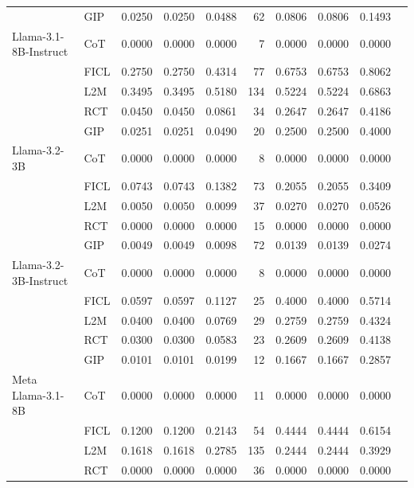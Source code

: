 \documentclass[conference]{IEEEtran}
\begin{document}
\begin{longtable}{p{3.5cm} l r r r r r r r r}
           & GIP  & 0.0250 & 0.0250 & 0.0488 & 62 & 0.0806 & 0.0806 & 0.1493 \\ \addlinespace
Llama-3.1-8B-Instruct & CoT  & 0.0000 & 0.0000 & 0.0000 & 7 & 0.0000 & 0.0000 & 0.0000 \\
                      & FICL & 0.2750 & 0.2750 & 0.4314 & 77 & 0.6753 & 0.6753 & 0.8062 \\
                      & L2M  & 0.3495 & 0.3495 & 0.5180 & 134 & 0.5224 & 0.5224 & 0.6863 \\
                      & RCT  & 0.0450 & 0.0450 & 0.0861 & 34 & 0.2647 & 0.2647 & 0.4186 \\
                      & GIP  & 0.0251 & 0.0251 & 0.0490 & 20 & 0.2500 & 0.2500 & 0.4000 \\ \addlinespace
Llama-3.2-3B & CoT  & 0.0000 & 0.0000 & 0.0000 & 8 & 0.0000 & 0.0000 & 0.0000 \\
             & FICL & 0.0743 & 0.0743 & 0.1382 & 73 & 0.2055 & 0.2055 & 0.3409 \\
             & L2M  & 0.0050 & 0.0050 & 0.0099 & 37 & 0.0270 & 0.0270 & 0.0526 \\
             & RCT  & 0.0000 & 0.0000 & 0.0000 & 15 & 0.0000 & 0.0000 & 0.0000 \\
             & GIP  & 0.0049 & 0.0049 & 0.0098 & 72 & 0.0139 & 0.0139 & 0.0274 \\ \addlinespace
Llama-3.2-3B-Instruct & CoT  & 0.0000 & 0.0000 & 0.0000 & 8 & 0.0000 & 0.0000 & 0.0000 \\
                      & FICL & 0.0597 & 0.0597 & 0.1127 & 25 & 0.4000 & 0.4000 & 0.5714 \\
                      & L2M  & 0.0400 & 0.0400 & 0.0769 & 29 & 0.2759 & 0.2759 & 0.4324 \\
                      & RCT  & 0.0300 & 0.0300 & 0.0583 & 23 & 0.2609 & 0.2609 & 0.4138 \\
                      & GIP  & 0.0101 & 0.0101 & 0.0199 & 12 & 0.1667 & 0.1667 & 0.2857 \\ \addlinespace
Meta Llama-3.1-8B & CoT  & 0.0000 & 0.0000 & 0.0000 & 11 & 0.0000 & 0.0000 & 0.0000 \\
                  & FICL & 0.1200 & 0.1200 & 0.2143 & 54 & 0.4444 & 0.4444 & 0.6154 \\
                  & L2M  & 0.1618 & 0.1618 & 0.2785 & 135 & 0.2444 & 0.2444 & 0.3929 \\
                  & RCT  & 0.0000 & 0.0000 & 0.0000 & 36 & 0.0000 & 0.0000 & 0.0000 \\

\end{longtable}
\end{document}
